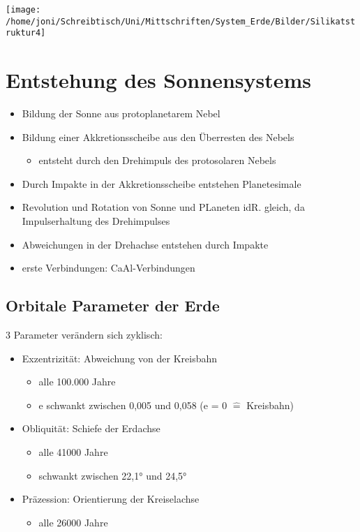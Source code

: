 \documentclass[a4,12pt]{scrreprt}
\begin{document}
\texttt{[image: /home/joni/Schreibtisch/Uni/Mittschriften/System\_Erde/Bilder/Silikatstruktur4]}\\

\newpage

\section{Entstehung des Sonnensystems}

\begin{itemize}
\item Bildung der Sonne aus protoplanetarem Nebel
\item Bildung einer Akkretionsscheibe aus den Überresten des Nebels
\begin{itemize}
\item entsteht durch den Drehimpuls des protosolaren Nebels
\end{itemize}
\item Durch Impakte in der Akkretionsscheibe entstehen Planetesimale
\item Revolution und Rotation von Sonne und PLaneten idR. gleich, da Impulserhaltung des Drehimpulses
\item Abweichungen in der Drehachse entstehen durch Impakte 
\item erste Verbindungen: CaAl-Verbindungen
\end{itemize}

\subsection{Orbitale Parameter der Erde} \label{sec:Orbitale Parameter der Erde}

3 Parameter verändern sich zyklisch:

\begin{itemize}
\item Exzentrizität: Abweichung von der Kreisbahn
\begin{itemize}
\item alle 100.000 Jahre
\item e schwankt zwischen 0,005 und 0,058 (e = 0 $\hat{=}$ Kreisbahn)
\end{itemize}
\item Obliquität: Schiefe der Erdachse
\begin{itemize}
\item alle 41000 Jahre
\item schwankt zwischen 22,1° und 24,5°
\end{itemize}
\item Präzession: Orientierung der Kreiselachse
\begin{itemize}
\item alle 26000 Jahre 
\end{itemize}
\end{itemize}
\end{document}
